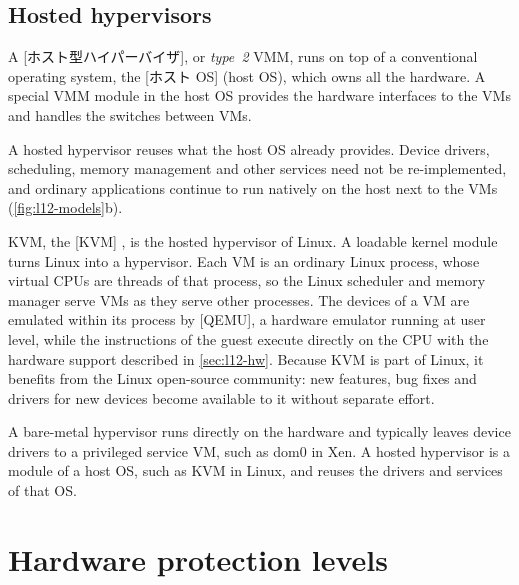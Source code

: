\documentclass[../main.tex]{subfiles}
\begin{document}
\subsection{Hosted hypervisors}

\begin{definition}
  A [ホスト型ハイパーバイザ], or \emph{type~2} VMM,
  runs on top of a conventional operating system, the
  [ホスト OS] (host OS), which owns all the
  hardware.  A special VMM module in the host OS provides the hardware
  interfaces to the VMs and handles the switches between VMs.
\end{definition}

A hosted hypervisor reuses what the host OS already provides.  Device
drivers, scheduling, memory management and other services need not be
re-implemented, and ordinary applications continue to run natively on the
host next to the VMs (\cref{fig:l12-models}b).

KVM, the [KVM]
\cite{kivity2007}, is the
hosted hypervisor of Linux.  A loadable kernel module turns Linux into a
hypervisor.  Each VM is an ordinary Linux process, whose virtual CPUs are
threads of that process, so the Linux scheduler and memory manager serve
VMs as they serve other processes.  The devices of a VM are emulated within
its process by [QEMU], a hardware emulator running at user
level, while the instructions of the guest execute directly on the CPU with
the hardware support described in \cref{sec:l12-hw}.  Because KVM is part
of Linux, it benefits from the Linux open-source community: new features,
bug fixes and drivers for new devices become available to it without
separate effort.

\begin{keypoint}
  A bare-metal hypervisor runs directly on the hardware and typically
  leaves device drivers to a privileged service VM, such as dom0 in Xen.  A
  hosted hypervisor is a module of a host OS, such as KVM in Linux, and
  reuses the drivers and services of that OS.
\end{keypoint}

\section{Hardware protection levels}
\label{sec:l12-rings}
\end{document}
